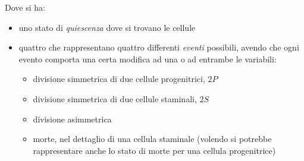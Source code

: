 \documentclass[a4paper,12pt, oneside]{book}
\begin{document}
Dove si ha:
\begin{itemize}
  \item uno stato di \textit{quiescenza} dove si trovano le cellule
  \item quattro che rappresentano quattro differenti \textit{eventi} possibili,
  avendo che ogni evento comporta una certa modifica ad una o ad entrambe le
  variabili:
  \begin{itemize}
    \item divisione simmetrica di due cellule progenitrici, $2P$
    \item divisione simmetrica di due cellule staminali, $2S$
    \item divisione asimmetrica
    \item morte, nel dettaglio di una cellula staminale (volendo si potrebbe
    rappresentare anche lo stato di morte per una cellula progenitrice)
  \end{itemize}
\end{itemize}
  
\end{document}
